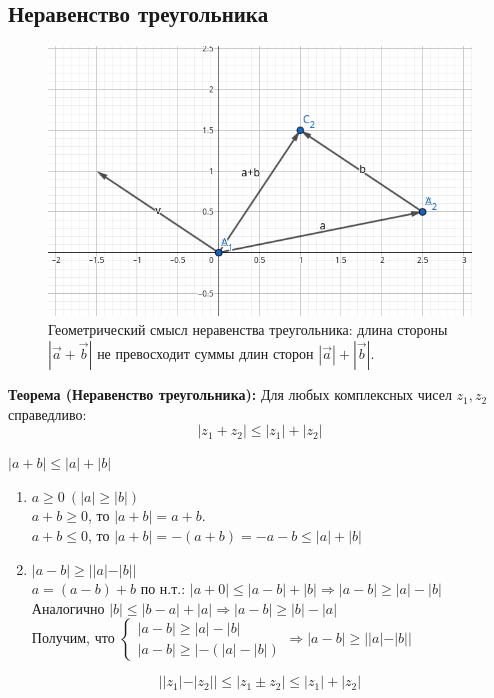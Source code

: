 \documentclass[12pt, paper]{article}
\begin{document}
\subsection{Неравенство треугольника}
\begin{figure}[h]
    \centering
    \includegraphics[width=0.5\linewidth]{images/Неравенство(вектора).png}
    \caption{Геометрический смысл неравенства треугольника: длина стороны \( |\vec{a} + \vec{b}| \) не превосходит суммы длин сторон \( |\vec{a}| + |\vec{b}| \).}
    \label{fig:triangle}
\end{figure}
\begin{tcolorbox}
\textbf{Теорема (Неравенство треугольника):}
Для любых комплексных чисел $z_1, z_2$ справедливо:
$$|z_1 + z_2| \leq |z_1| + |z_2|$$
\end{tcolorbox}

\begin{tcolorbox}[title=Доказательство, breakable]
$|a+b| \leq |a| + |b|$
\begin{enumerate}
    \item $a \geq 0\ (|a| \geq |b|)$ \\
    $a + b \geq 0$, то $|a+b| = a+b$.\\
    $a + b \leq 0$, то $|a+b| = -(a+b) = -a-b \leq |a|+|b|$
    \item $|a-b| \geq ||a|-|b||$\\
    $a = (a - b) + b$ по н.т.: $|a + 0| \leq |a-b|+|b| \Rightarrow |a-b| \geq |a|-|b|$ \\
    Аналогично $|b| \leq |b-a|+|a| \Rightarrow |a-b| \geq |b|-|a|$ \\
    Получим, что 
    $
    \begin{cases}
        |a-b| \geq |a|-|b|\\
        |a-b| \geq |-(|a|-|b|)
    \end{cases}
    \Rightarrow |a-b| \geq ||a|-|b||
    $
\end{enumerate}
\end{tcolorbox}

\begin{tcolorbox}[title=Следствие, breakable]
$$||z_1| - |z_2|| \leq |z_1 \pm z_2| \leq |z_1| + |z_2|$$
\end{tcolorbox}
\end{document}
